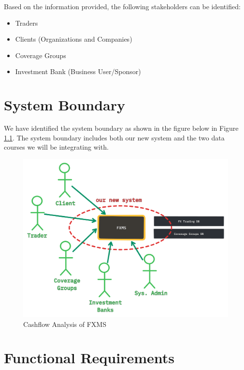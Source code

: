 \documentclass[a4paper]{report}
\begin{document}
Based on the information provided, the following stakeholders can be identified:
\begin{itemize}
    \item Traders
    \item Clients (Organizations and Companies)
    \item Coverage Groups
    \item Investment Bank (Business User/Sponsor)
\end{itemize}

\chapter{System Boundary}

We have identified the system boundary as shown in the figure below in Figure \ref{fig:system-boundary}. The system boundary includes both our new system and the two data courses we will be integrating with.

\begin{figure}[h!]
    \centering
    \includegraphics[width=\textwidth]{images/system-boundary.png}
    \caption{Cashflow Analysis of FXMS}
    \label{fig:system-boundary}
\end{figure}


\chapter{Functional Requirements}
\end{document}
